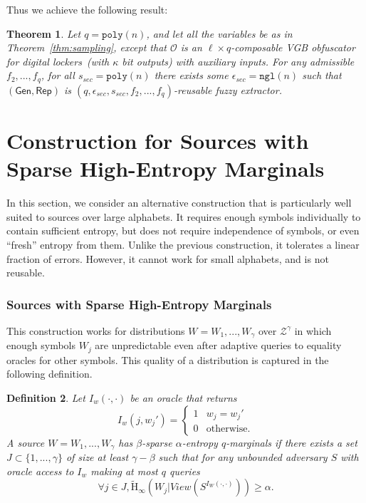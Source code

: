 \documentclass[11pt]{article}
\newtheorem{theorem}{Theorem}[section]
\newtheorem{definition}[theorem]{Definition}
\renewcommand{\paragraph}[1]{\subsubsection{#1}}
\newcommand{\thref}[1]{\mbox{Theorem~\ref{#1}}}
\newcommand{\class}[1]{{\ensuremath{\mathsf{#1}}}}
\newcommand{\gen}{\ensuremath{\class{Gen}}\xspace}
\newcommand{\rep}{\ensuremath{\class{Rep}}\xspace}
\newcommand{\poly}{\ensuremath{\mathtt{poly}}\xspace}
\newcommand{\ngl}{\ensuremath{\mathtt{ngl}}\xspace}
\newcommand{\Hav}{\tilde{\mathrm{H}}_\infty}
\begin{document}
  Thus we achieve the following result:

\begin{theorem}
\label{thm:reusability}
Let $q = \poly(n)$, and let all the variables be as in \thref{thm:sampling}, except that $\mathcal{O}$ is an $\ell\times q$-composable VGB obfuscator for digital lockers~(with $\kappa$ bit outputs) with auxiliary inputs.  For any admissible $f_2,..., f_q$, for all $s_{sec} = \poly(n)$ there exists some $\epsilon_{sec} = \ngl(n)$ such that $(\gen, \rep)$ is $(q, \epsilon_{sec}, s_{sec}, f_2,..., f_q)$-reusable fuzzy extractor.
\end{theorem}


\section{Construction for Sources with Sparse High-Entropy Marginals}
\label{sec:cor construction}
In this section, we consider an alternative construction that is particularly well suited to sources over large alphabets. It requires enough symbols individually to contain sufficient entropy, but does not require independence of symbols, or even ``fresh'' entropy from them. Unlike the previous construction, it tolerates a linear fraction of errors. However, it cannot work for small alphabets, and is not reusable.

\paragraph{Sources with Sparse High-Entropy Marginals} This construction works for distributions $W=W_1, ... ,W_\gamma$ over $\mathcal{Z}^\gamma $ in which enough symbols $W_j$ are unpredictable even after adaptive queries to equality oracles for other symbols. This quality of a distribution is captured in the following definition.

\begin{definition}
\label{def:block guessable}
Let $I_w (\cdot, \cdot)$ be an oracle that returns \[I_w(j, w_j')=
\begin{cases}
1 & w_j = w_j'\\
0 & \text{otherwise}.
\end{cases}
\]
A source $W = W_1, ... ,W_\gamma$ has $\beta$-sparse $\alpha$-entropy $q$-marginals if there exists a set $J\subset\{1,..., \gamma\}$ of size at least $\gamma -\beta$ such that for any unbounded adversary $S$ with oracle access to $I_w$ making at most $q$ queries
\[
\forall j\in J, \Hav(W_j |View(S^{I_{W}(\cdot, \cdot)}))\geq \alpha.
\]
\end{definition}
\end{document}
